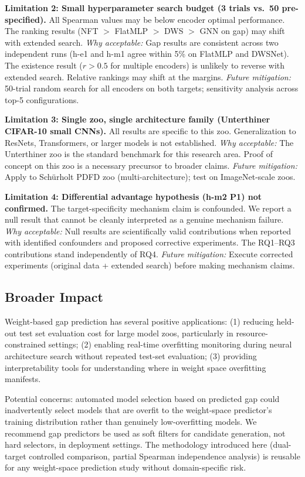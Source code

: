 \textbf{Limitation 2: Small hyperparameter search budget (3 trials vs.\ 50 pre-specified).}
All Spearman values may be below encoder optimal performance. The ranking results (NFT $>$ FlatMLP $>$ DWS
$>$ GNN on gap) may shift with extended search.
\textit{Why acceptable:} Gap results are consistent across two independent runs (h-e1 and h-m1 agree within
5\% on FlatMLP and DWSNet). The existence result ($r > 0.5$ for multiple encoders) is unlikely to
reverse with extended search. Relative rankings may shift at the margins.
\textit{Future mitigation:} 50-trial random search for all encoders on both targets; sensitivity analysis
across top-5 configurations.

\textbf{Limitation 3: Single zoo, single architecture family (Unterthiner CIFAR-10 small CNNs).}
All results are specific to this zoo. Generalization to ResNets, Transformers, or larger models is
not established.
\textit{Why acceptable:} The Unterthiner zoo is the standard benchmark for this research area. Proof of
concept on this zoo is a necessary precursor to broader claims.
\textit{Future mitigation:} Apply to Sch\"{u}rholt PDFD zoo (multi-architecture); test on ImageNet-scale zoos.

\textbf{Limitation 4: Differential advantage hypothesis (h-m2 P1) not confirmed.}
The target-specificity mechanism claim is confounded. We report a null result that cannot be cleanly
interpreted as a genuine mechanism failure.
\textit{Why acceptable:} Null results are scientifically valid contributions when reported with identified
confounders and proposed corrective experiments. The RQ1--RQ3 contributions stand independently of RQ4.
\textit{Future mitigation:} Execute corrected experiments (original data + extended search) before making
mechanism claims.

\subsection{Broader Impact}

Weight-based gap prediction has several positive applications: (1) reducing held-out test set evaluation
cost for large model zoos, particularly in resource-constrained settings; (2) enabling real-time
overfitting monitoring during neural architecture search without repeated test-set evaluation; (3)
providing interpretability tools for understanding where in weight space overfitting manifests.

Potential concerns: automated model selection based on predicted gap could inadvertently select
models that are overfit to the weight-space predictor's training distribution rather than genuinely
low-overfitting models. We recommend gap predictors be used as soft filters for candidate generation,
not hard selectors, in deployment settings. The methodology introduced here (dual-target controlled
comparison, partial Spearman independence analysis) is reusable for any weight-space prediction study
without domain-specific risk.
